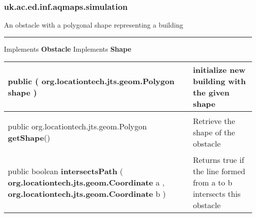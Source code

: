 \subsubsection*{ uk.ac.ed.inf.aqmaps.simulation }
 {\scriptsize An obstacle with a polygonal shape representing a building
 
\vspace*{4pt} \hrule \vspace*{3pt}
Implements \textbf{ Obstacle }
Implements \textbf{ Shape }
\vspace*{-5pt} 
\begin{tabularx}{\linewidth}{X|m{}}
\label{tab:Building}
\begin{raggedleft}public  \textbf{\hyperref[tab:Building]{\color{blue}{Building}} }(\hspace*{ 5pt} \textbf{org.locationtech.jts.geom.Polygon} shape  )
\end{raggedleft} &
 initialize new building with the given shape\\ \hline 
\begin{raggedleft}public org.locationtech.jts.geom.Polygon \textbf{getShape}()
\end{raggedleft} &
 Retrieve the shape of the obstacle\\ \hline 
\begin{raggedleft}public boolean \textbf{intersectsPath }(\newline \hfill 
\hspace*{ 5pt} \textbf{org.locationtech.jts.geom.Coordinate} a , \newline
 \hspace*{ 5pt} \textbf{org.locationtech.jts.geom.Coordinate} b  )
\end{raggedleft} &
 Returns true if the line formed from a to b intersects this obstacle\\\end{tabularx}
}
